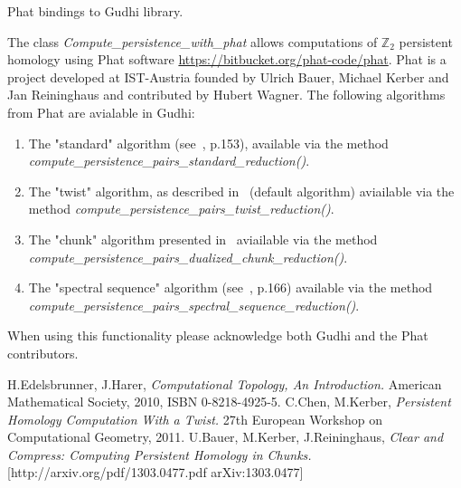 \documentclass[11pt]{article}
\begin{document}
\centerline{\sc \large Phat bindings to Gudhi library.}
\vspace{.5pc}

The class \emph{Compute\_persistence\_with\_phat} allows computations of 
$\mathbb{Z}_2$ 
persistent homology 
using Phat software \url{https://bitbucket.org/phat-code/phat}.
Phat is a project developed at IST-Austria founded by Ulrich Bauer, Michael Kerber and Jan Reininghaus 
and contributed by Hubert Wagner. The following algorithms from Phat are avialable in Gudhi:
\begin{enumerate}
\item The "standard" algorithm (see~\cite{one}, p.153), available via the method \emph{compute\_persistence\_pairs\_standard\_reduction()}.
\item The "twist" algorithm, as described in~\cite{three} (default algorithm) aviailable via the method \emph{compute\_persistence\_pairs\_twist\_reduction()}.
\item The "chunk" algorithm presented in~\cite{four}  aviailable via the method \emph{compute\_persistence\_pairs\_dualized\_chunk\_reduction()}.
\item The "spectral sequence" algorithm (see~\cite{one}, p.166)  available via the method \emph{compute\_persistence\_pairs\_spectral\_sequence\_reduction()}.
\end{enumerate}

When using this functionality please acknowledge both Gudhi and the Phat contributors. 

\begin{thebibliography}{9}
 H.Edelsbrunner, J.Harer, \emph{Computational Topology, An Introduction.} American Mathematical Society, 2010, ISBN 0-8218-4925-5.
 C.Chen, M.Kerber, \emph{Persistent Homology Computation With a Twist.} 27th European Workshop on Computational Geometry, 2011.
 U.Bauer, M.Kerber, J.Reininghaus, \emph{Clear and Compress: Computing Persistent Homology in Chunks.} [http://arxiv.org/pdf/1303.0477.pdf arXiv:1303.0477]
\end{thebibliography}
\end{document}
